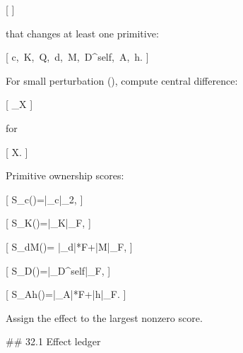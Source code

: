 [
\theta
]

that changes at least one primitive:

[
c,\ K,\ Q,\ d,\ M,\ D^{\rm self},\ A,\ h.
]

For small perturbation (\delta\theta), compute central difference:

[
\partial_\theta X
\approx
{}
]

for

[
X.
]

Primitive ownership scores:

[
S_c(\theta)=|\partial_\theta c|_2,
]

[
S_K(\theta)=|\partial_\theta K|_F,
]

[
S_{dM}(\theta)=
|\partial_\theta d|*F+|\partial*\theta M|_F,
]

[
S_D(\theta)=|\partial_\theta D^{\rm self}|_F,
]

[
S_{Ah}(\theta)=|\partial_\theta A|*F+|\partial*\theta h|_F.
]

Assign the effect to the largest nonzero score.

## 32.1 Effect ledger

